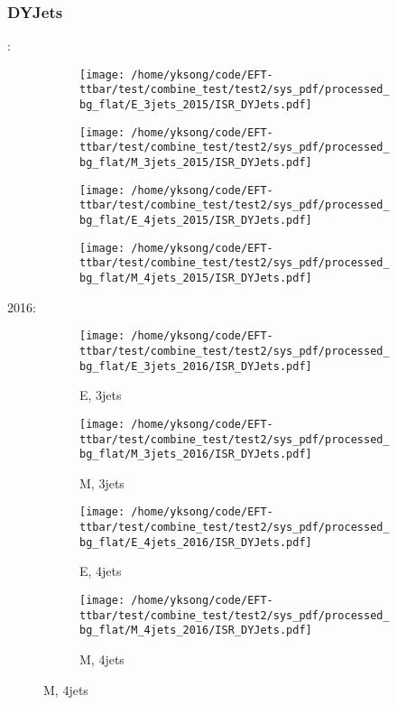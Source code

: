 \documentclass{beamer}
\begin{document}
\begin{frame}
\frametitle{DYJets}
\fontsize{5}{1}:
\begin{figure}
\centering
\begin{subfigure}[b]{0.24\textwidth}
\texttt{[image: /home/yksong/code/EFT-ttbar/test/combine\_test/test2/sys\_pdf/processed\_bg\_flat/E\_3jets\_2015/ISR\_DYJets.pdf]}
\end{subfigure}
\begin{subfigure}[b]{0.24\textwidth}
\texttt{[image: /home/yksong/code/EFT-ttbar/test/combine\_test/test2/sys\_pdf/processed\_bg\_flat/M\_3jets\_2015/ISR\_DYJets.pdf]}
\end{subfigure}
\begin{subfigure}[b]{0.24\textwidth}
\texttt{[image: /home/yksong/code/EFT-ttbar/test/combine\_test/test2/sys\_pdf/processed\_bg\_flat/E\_4jets\_2015/ISR\_DYJets.pdf]}
\end{subfigure}
\begin{subfigure}[b]{0.24\textwidth}
\texttt{[image: /home/yksong/code/EFT-ttbar/test/combine\_test/test2/sys\_pdf/processed\_bg\_flat/M\_4jets\_2015/ISR\_DYJets.pdf]}
\end{subfigure}
\end{figure}
2016:
\begin{figure}
\centering
\begin{subfigure}[b]{0.24\textwidth}
\texttt{[image: /home/yksong/code/EFT-ttbar/test/combine\_test/test2/sys\_pdf/processed\_bg\_flat/E\_3jets\_2016/ISR\_DYJets.pdf]}
\captionsetup{font=tiny}
\caption{E, 3jets}
\end{subfigure}
\begin{subfigure}[b]{0.24\textwidth}
\texttt{[image: /home/yksong/code/EFT-ttbar/test/combine\_test/test2/sys\_pdf/processed\_bg\_flat/M\_3jets\_2016/ISR\_DYJets.pdf]}
\captionsetup{font=tiny}
\caption{M, 3jets}
\end{subfigure}
\begin{subfigure}[b]{0.24\textwidth}
\texttt{[image: /home/yksong/code/EFT-ttbar/test/combine\_test/test2/sys\_pdf/processed\_bg\_flat/E\_4jets\_2016/ISR\_DYJets.pdf]}
\captionsetup{font=tiny}
\caption{E, 4jets}
\end{subfigure}
\begin{subfigure}[b]{0.24\textwidth}
\texttt{[image: /home/yksong/code/EFT-ttbar/test/combine\_test/test2/sys\_pdf/processed\_bg\_flat/M\_4jets\_2016/ISR\_DYJets.pdf]}
\captionsetup{font=tiny}
\caption{M, 4jets}
\end{subfigure}
\end{figure}
\end{frame}
\end{document}
